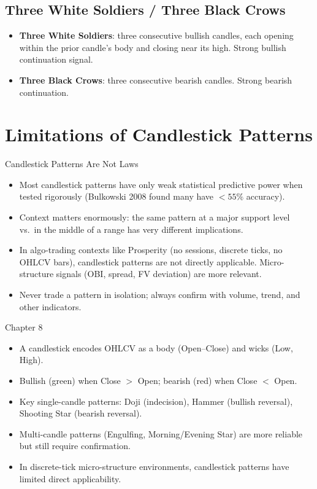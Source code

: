 \documentclass[12pt,a4paper,openany]{report}
\theoremstyle{definition}
\begin{document}
\subsection{Three White Soldiers / Three Black Crows}

\begin{itemize}
  \item \textbf{Three White Soldiers}: three consecutive bullish candles, each opening within the prior candle's body and closing near its high. Strong bullish continuation signal.
  \item \textbf{Three Black Crows}: three consecutive bearish candles. Strong bearish continuation.
\end{itemize}

\section{Limitations of Candlestick Patterns}

\begin{warningbox}{Candlestick Patterns Are Not Laws}
\begin{itemize}
  \item Most candlestick patterns have only weak statistical predictive power when tested rigorously (Bulkowski 2008 found many have $<55\%$ accuracy).
  \item Context matters enormously: the same pattern at a major support level vs.\ in the middle of a range has very different implications.
  \item In algo-trading contexts like Prosperity (no sessions, discrete ticks, no OHLCV bars), candlestick patterns are not directly applicable. Micro-structure signals (OBI, spread, FV deviation) are more relevant.
  \item Never trade a pattern in isolation; always confirm with volume, trend, and other indicators.
\end{itemize}
\end{warningbox}

\begin{takeawaybox}{Chapter 8}
\begin{itemize}
  \item A candlestick encodes OHLCV as a body (Open--Close) and wicks (Low, High).
  \item Bullish (green) when Close $>$ Open; bearish (red) when Close $<$ Open.
  \item Key single-candle patterns: Doji (indecision), Hammer (bullish reversal), Shooting Star (bearish reversal).
  \item Multi-candle patterns (Engulfing, Morning/Evening Star) are more reliable but still require confirmation.
  \item In discrete-tick micro-structure environments, candlestick patterns have limited direct applicability.
\end{itemize}
\end{takeawaybox}
\end{document}
